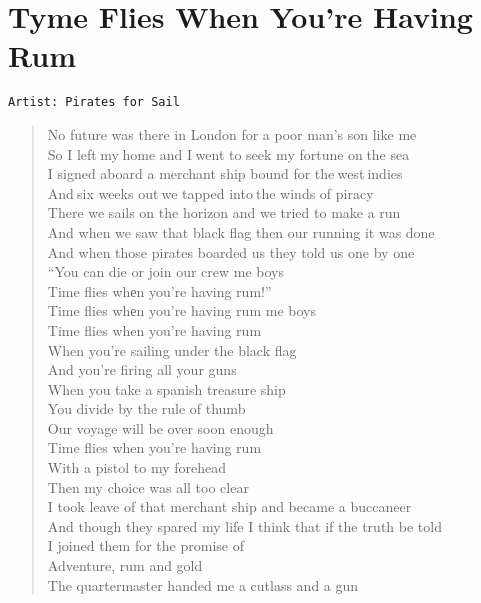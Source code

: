 \documentclass[11pt]{article}
\begin{document}
\section{Tyme Flies When You're Having Rum}
\label{sec:orgc5a4083}
\begin{verbatim}
Artist: Pirates for Sail
\end{verbatim}
\begin{verse}
No future was there in London for a poor man's son like me\\
So I left my home and I went to seek my fortune on the sea\\
I signed aboard a merchant ship bound for the west indies\\
And six weeks out we tapped into the winds of piracy\\
\vspace*{1em}
There we sails on the horizon and we tried to make a run\\
And when we saw that black flag then our running it was done\\
And when those pirates boarded us they told us one by one\\
``You can die or join our crew me boys\\
Time flies whеn you're having rum!''\\
Time flies whеn you're having rum me boys\\
Time flies when you're having rum\\
When you're sailing under the black flag\\
And you're firing all your guns\\
When you take a spanish treasure ship\\
You divide by the rule of thumb\\
Our voyage will be over soon enough\\
Time flies when you're having rum\\
\vspace*{1em}
With a pistol to my forehead\\
Then my choice was all too clear\\
I took leave of that merchant ship and became a buccaneer\\
And though they spared my life I think that if the truth be told\\
I joined them for the promise of\\
Adventure, rum and gold\\
\vspace*{1em}
The quartermaster handed me a cutlass and a gun\\

\end{verse}
\end{document}
